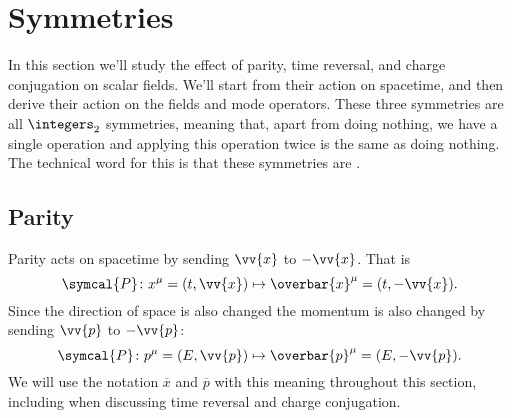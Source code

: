 \documentclass[fleqn]{NotesClass}
\newcommand{\parity}{\symcal{P}}
\begin{document}
    \section{Symmetries}
    In this section we'll study the effect of parity, time reversal, and charge conjugation on scalar fields.
    We'll start from their action on spacetime, and then derive their action on the fields and mode operators.
    These three symmetries are all \(\integers_2\) symmetries, meaning that, apart from doing nothing, we have a single operation and applying this operation twice is the same as doing nothing.
    The technical word for this is that these symmetries are .
    
    \subsection{Parity}
    Parity acts on spacetime by sending \(\vv{x}\) to \(-\vv{x}\).
    That is
    \begin{equation}
        \parity \colon x^\mu = (t, \vv{x}) \mapsto \overbar{x}^\mu = (t, -\vv{x}).
    \end{equation}
    Since the direction of space is also changed the momentum is also changed by sending \(\vv{p}\) to \(-\vv{p}\):
    \begin{equation}
        \parity \colon p^\mu = (E, \vv{p}) \mapsto \overbar{p}^\mu = (E, -\vv{p}).
    \end{equation}
    We will use the notation \(\overbar{x}\) and \(\overbar{p}\) with this meaning throughout this section, including when discussing time reversal and charge conjugation.
    
\end{document}
